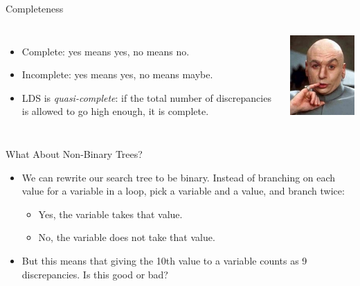\documentclass{beamer}
\begin{document}
\begin{frame}{Completeness}
    \begin{columns}
        \begin{itemize}
            \item Complete: yes means yes, no means no.
            \item Incomplete: yes means yes, no means maybe.
            \item LDS is \emph{quasi-complete}: if the total number of discrepancies is allowed to go
                high enough, it is complete.
        \end{itemize}
        \centering\includegraphics*[keepaspectratio=true,scale=0.4]{quasi.jpg}
    \end{columns}
\end{frame}

\begin{frame}{What About Non-Binary Trees?}
    \begin{itemize}
        \item We can rewrite our search tree to be binary. Instead of branching on each value for a
            variable in a loop, pick a variable and a value, and branch twice:

            \begin{itemize}
                \item Yes, the variable takes that value.
                \item No, the variable does not take that value.
            \end{itemize}

        \item But this means that giving the 10th value to a variable counts as 9 discrepancies. Is
            this good or bad?
    \end{itemize}
\end{frame}
\end{document}
